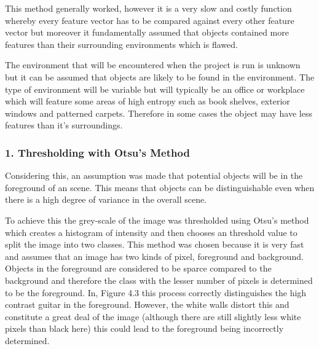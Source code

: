 \documentclass{mproj}
\begin{document}
This method generally worked, however it is a very slow and costly function whereby every feature vector has to be compared against every other feature vector but moreover it fundamentally assumed that objects contained more features than their surrounding environments which is flawed. 

The environment that will be encountered when the project is run is unknown but it can be assumed that objects are likely to be found in the environment. The type of environment will be variable but will typically be an office or workplace which will feature some areas of high entropy such as book shelves, exterior windows and patterned carpets. Therefore in some cases the object may have less features than it's surroundings.

\subsubsection{1. Thresholding with Otsu's Method}

Considering this, an assumption was made that potential objects will be in the foreground of an scene. This means that objects can be distinguishable even when there is a high degree of variance in the overall scene. 

To achieve this the grey-scale of the image was thresholded using Otsu's method which creates a histogram of intensity and then chooses an  threshold value to split the image into two classes. This method was chosen because it is very fast and assumes that an image has two kinds of pixel, foreground and background\cite{otsu}. Objects in the foreground are considered to be sparce compared to the background and therefore the class with the lesser number of pixels is determined to be the foreground. In, Figure 4.3 this process correctly distinguishes the high contrast guitar in the foreground. However, the white walls distort this and constitute a great deal of the image (although there are still slightly less white pixels than black here) this could lead to the foreground being incorrectly determined.
\end{document}
